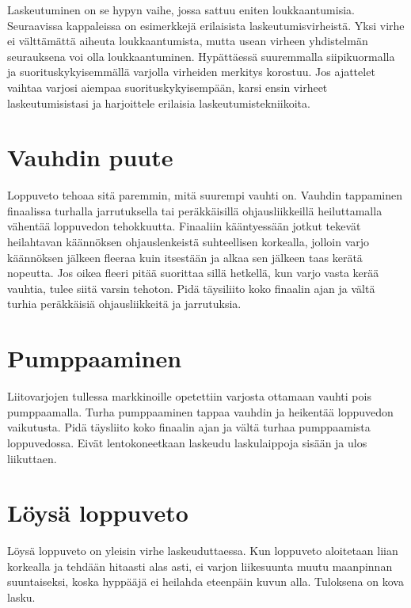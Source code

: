 
Laskeutuminen on se hypyn vaihe, jossa sattuu eniten loukkaantumisia. Seuraavissa kappaleissa on esimerkkejä erilaisista laskeutumisvirheistä. Yksi virhe ei välttämättä aiheuta loukkaantumista, mutta usean virheen yhdistelmän seurauksena voi olla loukkaantuminen. Hypättäessä suuremmalla siipikuormalla ja suorituskykyisemmällä varjolla virheiden merkitys korostuu. Jos ajattelet vaihtaa varjosi aiempaa suorituskykyisempään, karsi ensin virheet laskeutumisistasi ja harjoittele erilaisia laskeutumistekniikoita. 

\section{ Vauhdin puute }
\label{laskeutumisvirheet-vauhdin-puute}


Loppuveto tehoaa sitä paremmin, mitä suurempi vauhti on. Vauhdin tappaminen finaalissa turhalla jarrutuksella tai peräkkäisillä ohjausliikkeillä heiluttamalla vähentää loppuvedon tehokkuutta. Finaaliin kääntyessään jotkut tekevät heilahtavan käännöksen ohjauslenkeistä suhteellisen korkealla, jolloin varjo käännöksen jälkeen fleeraa kuin itsestään ja alkaa sen jälkeen taas kerätä nopeutta. Jos oikea fleeri pitää suorittaa sillä hetkellä, kun varjo vasta kerää vauhtia, tulee siitä varsin tehoton. Pidä täysiliito koko finaalin ajan ja vältä turhia peräkkäisiä ohjausliikkeitä ja jarrutuksia. 

\section{ Pumppaaminen }
\label{laskeutumisvirheet-pumppaaminen}


Liitovarjojen tullessa markkinoille opetettiin varjosta ottamaan vauhti pois pumppaamalla. Turha pumppaaminen tappaa vauhdin ja heikentää loppuvedon vaikutusta. Pidä täysliito koko finaalin ajan ja vältä turhaa pumppaamista loppuvedossa. Eivät lentokoneetkaan laskeudu laskulaippoja sisään ja ulos liikuttaen. 

\section{ Löysä loppuveto }
\label{laskeutumisvirheet-loysa-loppuveto}


Löysä loppuveto on yleisin virhe laskeuduttaessa. Kun loppuveto aloitetaan liian korkealla ja tehdään hitaasti alas asti, ei varjon liikesuunta muutu maanpinnan suuntaiseksi, koska hyppääjä ei heilahda eteenpäin kuvun alla. Tuloksena on kova lasku. 

